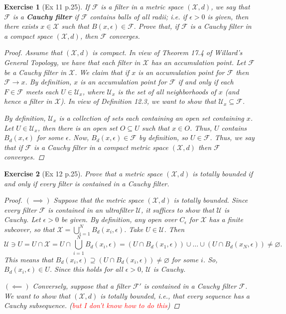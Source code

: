 \documentclass[11pt]{article}
\newtheorem{exercise}{Exercise}
\newcommand{\F}{\mathcal{F}}
\newcommand{\X}{\mathcal{X}}
\begin{document}
\begin{exercise}[Ex 11 p.25]
If $\mathcal{F}$ is a filter in a metric space $(\X , d)$, we say that $\F$ is a \textbf{Cauchy filter} if $\F$ contains balls of all radii; i.e. if $\epsilon > 0$ is given, then there exists $x \in \X$ such that $B(x, \epsilon) \in \F.$ Prove that, if $\F$ is a Cauchy filter in a compact space $(\X , d)$, then $\F$ converges.

	\begin{proof}
	Assume that $(\X,d)$ is compact. In view of Theorem 17.4 of Willard's \textit{General Topology}, we have that each filter in $\X$ has an accumulation point. Let $\F$ be a Cauchy filter in $\X$. We claim that if $x$ is an accumulation point for $\F$ then $\F \to x$. By definition, $x$ is an accumulation point for $\F$ if and only if each $F\in \F$ meets each $U\in \mathcal{U}_x$, where $\mathcal{U}_x$ is the set of all neighborhoods of $x$ (and hence a filter in $\X$). In view of Definition 12.3, we want to show that $\mathcal{U}_x \subseteq \F$. 
	
	By definition, $\mathcal{U}_x$ is a collection of sets each containing an open set containing $x$. Let $U\in \mathcal{U}_x$, then there is an open set $O \subseteq U$ such that $x\in O$. Thus, $U$ contains $B_d(x,\epsilon)$ for some $\epsilon$. Now, $B_d(x,\epsilon) \in \F$ by definition, so $U\in \F$. Thus, we say that if $\F$ is a Cauchy filter in a compact metric space $(\X,d)$ then $\F$ converges.  
	\end{proof}
\end{exercise}

\begin{exercise}[Ex 12 p.25]
	Prove that a metric space $(\X , d)$ is totally bounded if and only if every filter is contained in a Cauchy filter. 
	\begin{proof}
		$(\implies)$ Suppose that the metric space $(\X,d)$ is totally bounded. Since every filter $\F$ is contained in an ultrafilter $\mathcal{U}$, it suffices to show that $\mathcal{U}$ is Cauchy. Let $\epsilon > 0$ be given. By definition, any open over $C_\epsilon$ for $\X$ has a finite subcover, so that $\X = \bigcup_{i=1}^N B_d(x_i,\epsilon)$.  Take $U\in \mathcal{U}$. Then 
		\begin{equation*}
		\mathcal{U}\ni U = U\cap \X = U \cap \bigcup^N_{i=1} B_d(x_i,\epsilon) = (U \cap B_d(x_1,\epsilon)) \cup \dots \cup (U \cap B_d(x_N,\epsilon)) \neq \varnothing.
		\end{equation*}
		This means that $B_d(x_i, \epsilon) \supseteq (U \cap B_d(x_i,\epsilon)) \neq \varnothing$ for some $i$. So, $B_d(x_i,\epsilon) \in U$. Since this holds for all $\epsilon >0$, $\mathcal{U}$ is Cauchy. 
		
		
		$(\impliedby)$ Conversely, suppose that a filter $\F'$ is contained in a Cauchy filter $\F$. We want to show that $(\X,d)$ is totally bounded, i.e., that every sequence has a Cauchy subsequence. (\textcolor{red}{but I don't know how to do this}) 	
	\end{proof}
\end{exercise}
\end{document}
